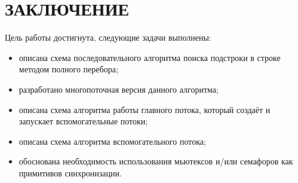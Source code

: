 \section*{ЗАКЛЮЧЕНИЕ}

Цель работы достигнута, следующие задачи выполнены:
\begin{itemize}
	\item описана схема последовательного алгоритма поиска подстроки в строке методом полного перебора;
	\item разработано многопоточная версия данного алгоритма;
	\item описана схема алгоритма работы главного потока, который создаёт и запускает вспомогательные потоки;
	\item описана схема алгоритма вспомогательного потока;
	\item обоснована необходимость использования мьютексов и/или семафоров как примитивов синхронизации.
\end{itemize}
